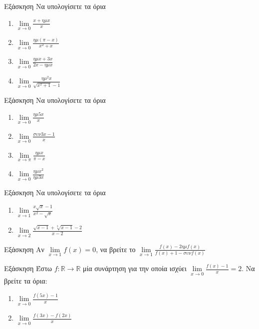 \documentclass[greek]{beamer}
\begin{document}
\begin{frame}{Εξάσκηση}
  Να υπολογίσετε τα όρια
  \begin{enumerate}
    \item $\lim\limits_{x \to 0}{ \frac{x+ημx}{x} }$ \pause
    \item $\lim\limits_{x \to 0}{ \frac{ημ(π-x)}{x^2+x} }$ \pause
    \item $\lim\limits_{x \to 0}{ \frac{ημx+3x}{2x-ημx} }$ \pause
    \item $\lim\limits_{x \to 0}{ \frac{ημ^2x}{\sqrt{x^2+1}-1} }$
  \end{enumerate}
\end{frame}

\begin{frame}{Εξάσκηση}
  Να υπολογίσετε τα όρια
  \begin{enumerate}
    \item $\lim\limits_{x \to 0}{ \frac{ημ5x}{x} }$ \pause
    \item $\lim\limits_{x \to 0}{ \frac{συν3x-1}{x} }$ \pause
    \item $\lim\limits_{x \to π}{ \frac{ημx}{π-x} }$ \pause
    \item $\lim\limits_{x \to 0}{ \frac{ημx^2}{ημ3x} }$
  \end{enumerate}
\end{frame}

\begin{frame}{Εξάσκηση}
  Να υπολογίσετε τα όρια
  \begin{enumerate}
    \item $\lim\limits_{x \to 1}{ \frac{x\sqrt{x}-1}{x^2-\sqrt{x}} }$ \pause
    \item $\lim\limits_{x \to 2}{ \frac{\sqrt{x-1}+\sqrt[3]{x-1}-2}{x-2} }$
  \end{enumerate}
\end{frame}

\begin{frame}{Εξάσκηση}
  Αν $\lim\limits_{x \to 1}{ f(x) }=0$, να βρείτε το $\lim\limits_{x \to 1}{ \frac{f(x)-2ημf(x)}{f(x)+1-συνf(x)} }$
\end{frame}

\begin{frame}{Εξάσκηση}
  Έστω $f:\mathbb{R}\to\mathbb{R}$ μία συνάρτηση για την οποία ισχύει $\lim\limits_{x \to 0}{ \frac{f(x)-1}{x} }=2$. Να βρείτε τα όρια:
  \begin{enumerate}
    \item $\lim\limits_{x \to 0}{ \frac{f(5x)-1}{x} }$ \pause
    \item $\lim\limits_{x \to 0}{ \frac{f(3x)-f(2x)}{x} }$
  \end{enumerate}
\end{frame}
\end{document}

